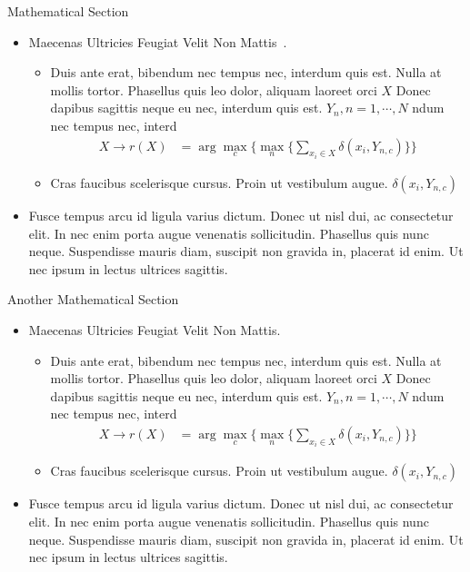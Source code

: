 {\begin{block}{Mathematical Section}
	\begin{itemize}
		\item Maecenas Ultricies Feugiat Velit Non Mattis~\cite{combettes2014}.
		\begin{itemize}
			\item Duis ante erat, bibendum nec tempus nec, interdum quis est. Nulla at mollis tortor. Phasellus quis leo dolor, aliquam laoreet orci $X$ Donec dapibus sagittis neque eu nec, interdum quis est. $Y_n, n=1,\cdots,N$ ndum nec tempus nec, interd
			\begin{align*}
			X \rightarrow r(X) & = \arg \max_{c} \Big\{ \max_n \big\{ \sum_{x_i \in X} \delta(x_i,Y_{n,c})\big\} \Big\} 
			\end{align*}
			\item Cras faucibus scelerisque cursus. Proin ut vestibulum augue. $\delta(x_i,Y_{n,c})$
		\end{itemize}
		\item Fusce tempus arcu id ligula varius dictum. Donec ut nisl dui, ac consectetur elit. In nec enim porta augue venenatis sollicitudin. Phasellus quis nunc neque. Suspendisse mauris diam, suscipit non gravida in, placerat id enim. Ut nec ipsum in lectus ultrices sagittis.
	\end{itemize}
	
\end{block}
\vfill

\begin{block}{Another Mathematical Section}
	
	\begin{itemize}
		\item Maecenas Ultricies Feugiat Velit Non Mattis.
		\begin{itemize}
			\item Duis ante erat, bibendum nec tempus nec, interdum quis est. Nulla at mollis tortor. Phasellus quis leo dolor, aliquam laoreet orci $X$ Donec dapibus sagittis neque eu nec, interdum quis est. $Y_n, n=1,\cdots,N$ ndum nec tempus nec, interd
			\begin{align*}
			X \rightarrow r(X) & = \arg \max_{c} \Big\{ \max_n \big\{ \sum_{x_i \in X} \delta(x_i,Y_{n,c})\big\} \Big\} 
			\end{align*}
			\item Cras faucibus scelerisque cursus. Proin ut vestibulum augue. $\delta(x_i,Y_{n,c})$
		\end{itemize}
		\item Fusce tempus arcu id ligula varius dictum. Donec ut nisl dui, ac consectetur elit. In nec enim porta augue venenatis sollicitudin. Phasellus quis nunc neque. Suspendisse mauris diam, suscipit non gravida in, placerat id enim. Ut nec ipsum in lectus ultrices sagittis.
	\end{itemize}
	
\end{block}
}%